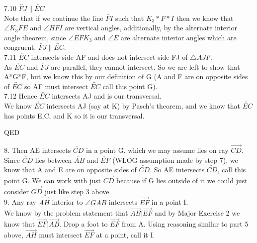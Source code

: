 \documentclass[12pt,letterpaper]{article}
\newcommand{\QED}{\begin{flushright}QED\end{flushright}}
\begin{document}
7.10 $\overleftrightarrow{FJ} \parallel \overleftrightarrow{EC}$\\

Note that if we continue the line $\overleftrightarrow{FI}$ such that $K_3 * F * I$ then we know that $\angle K_3FE$ and $\angle HFI$ are vertical angles, additionally, by the alternate interior angle theorem, since $\angle EFK_3$ and $\angle E$ are alternate interior angles which are congruent, $\overleftrightarrow{FJ} \parallel \overleftrightarrow{EC}$.\\

7.11 $\overleftrightarrow{EC}$ intersects side AF and does not intersect side FJ of $\triangle AJF$. \\

As $\overleftrightarrow{EC}$ and $\overleftrightarrow{FJ}$ are parallel, they cannot intersect.  So we are left to show that A*G*F, but we know this by our definition of G (A and F are on opposite sides of $\overleftrightarrow{EC}$ so AF must intersect $\overleftrightarrow{EC}$ call this point G).  \\



7.12 Hence $\overleftrightarrow{EC}$ intersects AJ and is our transversal.\\

We know $\overleftrightarrow{EC}$ intersects AJ (say at K) by Pasch's theorem, and we know that $\overleftrightarrow{EC}$ has points E,C, and K so it is our transversal.

\QED


8. Then AE intersects $\overleftrightarrow{CD}$ in a point G, which we may assume lies on ray $\overrightarrow{CD}$. \\

Since $\overleftrightarrow{CD}$ lies between $\overleftrightarrow{AB}$ and $\overleftrightarrow{EF}$ (WLOG assumption made by step 7), we know that A and E are on opposite sides of $\overleftrightarrow{CD}$.  So AE intersects $\overleftrightarrow{CD}$, call this point G.  We can work with just $\overrightarrow{CD}$ because if G lies outside of it we could just consider $\overrightarrow{GD}$ just like step 3 above.\\

9. Any ray $\overrightarrow{AH}$ interior to $\angle GAB$ intersects $\overrightarrow{EF}$ in a point I.\\

We know by the problem statement that $\overrightarrow{AB} | \overrightarrow{EF}$ and by Major Exercise 2 we know that $\overrightarrow{EF} | \overrightarrow{AB}$.  Drop a foot to $\overrightarrow{EF}$ from A.  Using reasoning similar to part 5 above, $\overrightarrow{AH}$ must intersect $\overrightarrow{EF}$ at a point, call it I.  \\
\end{document}
